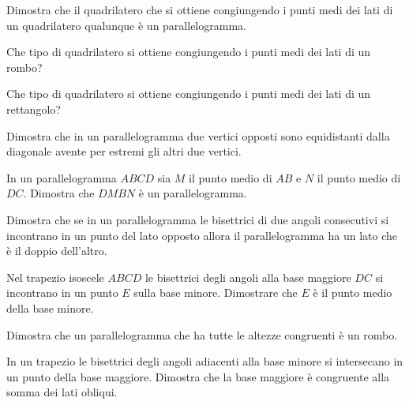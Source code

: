\begin{multicols}{2}
\begin{esercizio}
\label{ese:4.49}
Dimostra che il quadrilatero che si ottiene congiungendo i punti medi 
dei lati di un quadrilatero qualunque è un parallelogramma.
\end{esercizio}

\begin{esercizio}
\label{ese:4.50}
Che tipo di quadrilatero si ottiene congiungendo i punti medi dei 
lati di un rombo?
\end{esercizio}

\begin{esercizio}
\label{ese:4.51}
Che tipo di quadrilatero si ottiene congiungendo i punti medi dei 
lati di un rettangolo?
\end{esercizio}

\begin{esercizio}
\label{ese:4.52}
Dimostra che in un parallelogramma due vertici opposti sono 
equidistanti dalla diagonale avente per estremi gli altri due vertici.
\end{esercizio}

\begin{esercizio}
\label{ese:4.53}
In un parallelogramma \(ABCD\) sia \(M\) il punto medio di \(AB\) e \(N\) il 
punto medio di \(DC\). Dimostra che \(DMBN\) è un parallelogramma.
\end{esercizio}

\begin{esercizio}
\label{ese:4.54}
Dimostra che se in un parallelogramma le bisettrici di due angoli 
consecutivi si incontrano in un punto del lato opposto allora il 
parallelogramma ha un lato che è il doppio dell'altro.
\end{esercizio}

\begin{esercizio}
\label{ese:4.55}
Nel trapezio isoscele \(ABCD\) le bisettrici degli angoli alla base 
maggiore \(DC\) si incontrano in un punto \(E\) sulla base minore. 
Dimostrare che \(E\) è il punto medio della base minore.
\end{esercizio}

\begin{esercizio}
\label{ese:4.56}
Dimostra che un parallelogramma che ha tutte le altezze congruenti è 
un rombo.
\end{esercizio}

\begin{esercizio}
\label{ese:4.57}
In un trapezio le bisettrici degli angoli adiacenti alla base minore 
si intersecano in un punto della base maggiore. Dimostra che la base 
maggiore è congruente alla somma dei lati obliqui.
\end{esercizio}


\end{multicols}
